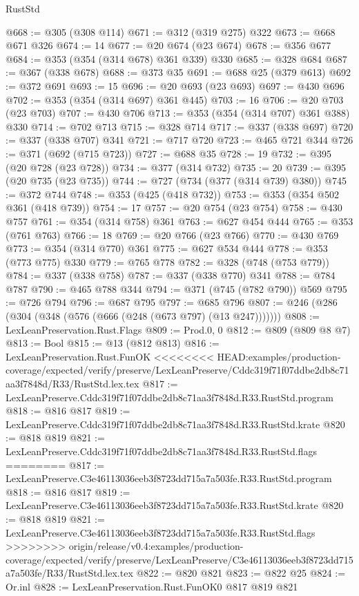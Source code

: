 \begin{lexlean}{RustStd}
\begin{coremodule}
{\begin{coremodule}
{{{{{{{{@668 := @305 (@308 @114)
@671 := @312 (@319 @275) @322
@673 := @668 @671 @326
@674 := 14
@677 := @20 @674 (@23 @674)
@678 := @356 @677
@684 := @353 (@354 (@314 @678) @361 @339) @330
@685 := @328 @684
@687 := @367 (@338 @678)
@688 := @373 @35
@691 := @688 @25 (@379 @613)
@692 := @372 @691
@693 := 15
@696 := @20 @693 (@23 @693)
@697 := @430 @696
@702 := @353 (@354 (@314 @697) @361 @445)
@703 := 16
@706 := @20 @703 (@23 @703)
@707 := @430 @706
@713 := @353 (@354 (@314 @707) @361 @388) @330
@714 := @702 @713
@715 := @328 @714
@717 := @337 (@338 @697)
@720 := @337 (@338 @707) @341
@721 := @717 @720
@723 := @465 @721 @344
@726 := @371 (@692 (@715 @723))
@727 := @688 @35
@728 := 19
@732 := @395 (@20 @728 (@23 @728))
@734 := @377 (@314 @732)
@735 := 20
@739 := @395 (@20 @735 (@23 @735))
@744 := @727 (@734 (@377 (@314 @739) @380))
@745 := @372 @744
@748 := @353 (@425 (@418 @732))
@753 := @353 (@354 @502 @361 (@418 @739))
@754 := 17
@757 := @20 @754 (@23 @754)
@758 := @430 @757
@761 := @354 (@314 @758) @361
@763 := @627 @454 @444
@765 := @353 (@761 @763)
@766 := 18
@769 := @20 @766 (@23 @766)
@770 := @430 @769
@773 := @354 (@314 @770) @361
@775 := @627 @534 @444
@778 := @353 (@773 @775) @330
@779 := @765 @778
@782 := @328 (@748 (@753 @779))
@784 := @337 (@338 @758)
@787 := @337 (@338 @770) @341
@788 := @784 @787
@790 := @465 @788 @344
@794 := @371 (@745 (@782 @790)) @569
@795 := @726 @794
@796 := @687 @795
@797 := @685 @796
@807 := @246 (@286 (@304 (@348 (@576 (@666 (@248 (@673 @797) (@13 @247)))))))
@808 := LexLeanPreservation.Rust.Flags
@809 := Prod.{0, 0}
@812 := @809 (@809 @8 @7)
@813 := Bool
@815 := @13 (@812 @813)
@816 := LexLeanPreservation.Rust.FunOK
<<<<<<<< HEAD:examples/production-coverage/expected/verify/preserve/LexLeanPreserve/Cddc319f71f07ddbe2db8c71aa3f7848d/R33/RustStd.lex.tex
@817 := LexLeanPreserve.Cddc319f71f07ddbe2db8c71aa3f7848d.R33.RustStd.program
@818 := @816 @817
@819 := LexLeanPreserve.Cddc319f71f07ddbe2db8c71aa3f7848d.R33.RustStd.krate
@820 := @818 @819
@821 := LexLeanPreserve.Cddc319f71f07ddbe2db8c71aa3f7848d.R33.RustStd.flags
========
@817 := LexLeanPreserve.C3e46113036eeb3f8723dd715a7a503fe.R33.RustStd.program
@818 := @816 @817
@819 := LexLeanPreserve.C3e46113036eeb3f8723dd715a7a503fe.R33.RustStd.krate
@820 := @818 @819
@821 := LexLeanPreserve.C3e46113036eeb3f8723dd715a7a503fe.R33.RustStd.flags
>>>>>>>> origin/release/v0.4:examples/production-coverage/expected/verify/preserve/LexLeanPreserve/C3e46113036eeb3f8723dd715a7a503fe/R33/RustStd.lex.tex
@822 := @820 @821
@823 := @822 @25
@824 := Or.inl
@828 := LexLeanPreservation.Rust.FunOK0 @817 @819 @821
}}}}}}}}
\end{coremodule}}
\end{coremodule}
\end{lexlean}
